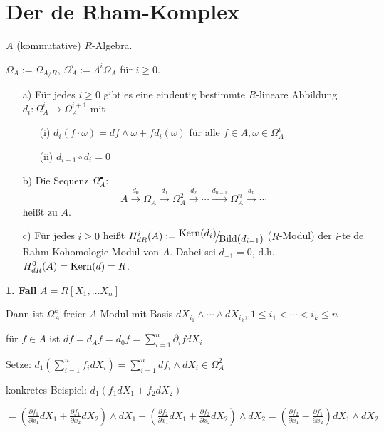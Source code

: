 \section{Der de Rham-Komplex}

$A$ (kommutative) $R$-Algebra.

$\Omega_A := \Omega_{A/R}$, $\Omega^i_A := \Lambda^i\Omega_A$ für $i \geq 0$.

\begin{SatzDef}
\begin{enumerate}
\item[a)] Für jedes $i \geq 0$ gibt es eine eindeutig bestimmte $R$-lineare Abbildung $d_i : \Omega^i_A \rightarrow \Omega^{i+1}_A$ mit
\begin{enumerate}
\item[(i)] $d_i(f \cdot \omega) = df \wedge \omega + f d_i(\omega)$ für alle $f \in A, \omega \in \Omega^i_A$
\item[(ii)] $d_{i+1} \circ d_i = 0$
\end{enumerate}

\item[b)]
Die Sequenz $\Omega^\bullet_A$:
$$A \overset{d_0}{\rightarrow} \Omega_A \overset{d_1}{\rightarrow} \Omega^2_A \overset{d_2}{\rightarrow} \cdots \overset{d_{n-1}}{\rightarrow} \Omega^n_A  \overset{d_n}{\rightarrow} \cdots$$
heißt  zu $A$.

\item[c)]
Für jedes $i\geq 0$ hei\ss t $H_{dR}^i(A)\defeqr \FakRaum{\Kern(d_i)}{\Bild(d_{i-1})}$ ($R$-Modul)
der $i$-te de Rahm-Kohomologie-Modul von $A$. Dabei sei $d_{-1}=0$, d.h. $H_{dR}^0(A)=\operatorname{Kern}(d)=R$.

\end{enumerate}

\begin{Bew}
\textbf{1. Fall} $A = R[X_1, \ldots X_n]$

Dann ist $\Omega^k_A$ freier $A$-Modul mit Basis $d X_{i_1} \wedge \cdots \wedge d X_{i_k}$, $1 \leq i_1 < \cdots < i_k \leq n$

für $f \in A$ ist $df = d_A f = d_0 f = \sum_{i=1}^n \partial_i f d X_i$

Setze: $d_1(\sum_{i=1}^n f_i d X_i) = \sum_{i=1}^n d f_i \wedge d X_i \in \Omega^2_A$

konkretes Beispiel: $d_1(f_1 dX_1 + f_2 dX_2)$

$= (\frac{\partial f_1}{\partial x_1} dX_1 + \frac{\partial f_1}{\partial x_2} dX_2) \wedge dX_1 + (\frac{\partial f_2}{\partial x_1} dX_1 + \frac{\partial f_2}{\partial x_2} dX_2) \wedge dX_2 = (\frac{\partial f_2}{\partial x_1} - \frac{\partial f_1}{\partial x_2}) dX_1 \wedge dX_2$


\end{Bew}
\end{SatzDef}
